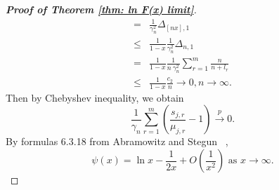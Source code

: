 \documentclass[12pt]{article}
\theoremstyle{plain}
\theoremstyle{definition}
\theoremstyle{remark}
\begin{document}
\begin{proof}[\textit{\textbf{Proof of Theorem \ref{thm: ln F(x) limit}}}]
\begin{equation*}
\begin{aligned}
            =&\frac{1}{\gamma_{n}^2}\Delta_{[nx], 1}\\
            \leq&\frac{1}{1-x}\frac{1}{\gamma_{n}^2}\Delta_{n, 1}\\
            =&\frac{1}{1-x}\frac{1}{n\  \gamma_{n}^2}\sum_{r=1}^{m}\frac{n}{n+l_r}\\
            \leq &\frac{1}{1-x}\frac{c_2}{n }\to 0, n\to \infty.
        \end{aligned}
    \end{equation*}
    Then by Chebyshev inequality, we obtain
    \begin{equation}\label{term1}
    \frac{1}{\gamma_n}\sum_{r=1}^{m}\left(\frac{s_{j, r}}{\mu_{j, r}}-1\right) \stackrel{p}{\rightarrow} 0.
    \end{equation}
By formulas 6.3.18 from Abramowitz and Stegun ~\cite{Handbook of
Mathematical Functions},
\begin{equation*}
 \psi(x)=\ln x-\frac{1}{2 x}+O\left(\frac{1}{x^{2}}\right) \text{ as }x\to \infty.
\end{equation*}


\end{proof}
\end{document}
